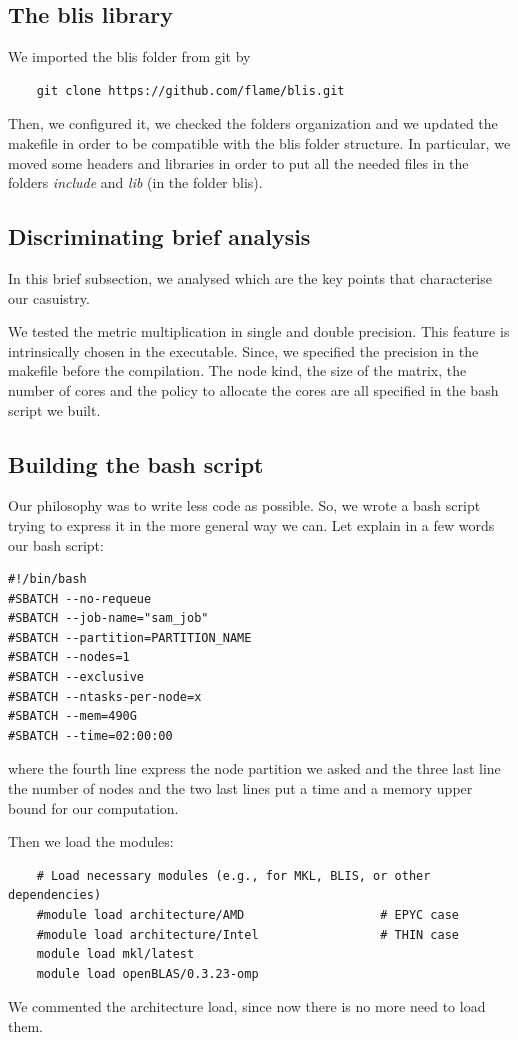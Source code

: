 \documentclass[12pt, titlepage]{report}
\begin{document}
\subsection{The blis library}
We imported the blis folder from git by
\begin{verbatim}
    git clone https://github.com/flame/blis.git
\end{verbatim}
Then, we configured it, we checked the folders organization and we updated the makefile in order to be compatible with the blis folder structure.   
In particular, we moved some headers and libraries in order to put all the needed files in the folders \textit{include} and \textit{lib} (in the folder blis).

\subsection{Discriminating brief analysis}
In this brief subsection, we analysed which are the key points that characterise our casuistry.  

We tested the metric multiplication in single and double precision. This feature is intrinsically chosen in the executable. Since, we specified the precision in the makefile before the compilation.
The node kind, the size of the matrix, the number of cores and the policy to allocate the cores are all specified in the bash script we built. 

\subsection{Building the bash script}
Our philosophy was to write less code as possible. So, we wrote a bash script trying to express it in the more general way we can.  
Let explain in a few words our bash script:
\begin{verbatim}
#!/bin/bash
#SBATCH --no-requeue
#SBATCH --job-name="sam_job"
#SBATCH --partition=PARTITION_NAME
#SBATCH --nodes=1
#SBATCH --exclusive
#SBATCH --ntasks-per-node=x
#SBATCH --mem=490G
#SBATCH --time=02:00:00
\end{verbatim}
where the fourth line express the node partition we asked and the three last line the number of nodes and the two last lines put a time and a memory upper bound for our computation.   

Then we load the modules:
\begin{verbatim}
    # Load necessary modules (e.g., for MKL, BLIS, or other dependencies)
    #module load architecture/AMD                   # EPYC case
    #module load architecture/Intel                 # THIN case
    module load mkl/latest
    module load openBLAS/0.3.23-omp
\end{verbatim}
We commented the architecture load, since now there is no more need to load them. 
\end{document}
